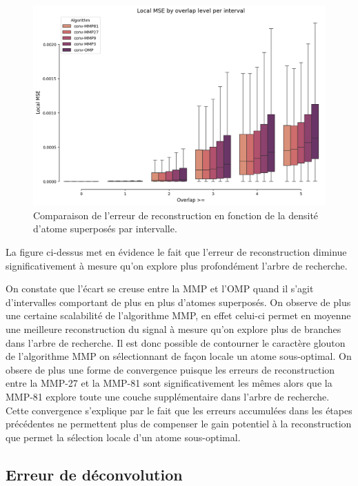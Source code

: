 \documentclass[9pt,a4paper,twoside]{rho}
\begin{document}
\begin{figure}[H]
    \centering
    \includegraphics[width=1\linewidth]{images/boxplot_mse.png}
    \caption{Comparaison de l'erreur de reconstruction en fonction de la densité d'atome superposés par intervalle.}
    \label{fig:boxplot_mse}
\end{figure}

La figure ci-dessus met en évidence le fait que l'erreur de reconstruction diminue significativement à mesure qu'on explore plus profondément l'arbre de recherche.

On constate que l'écart se creuse entre la MMP et l'OMP quand il s'agit d'intervalles comportant de plus en plus d'atomes superposés.
On observe de plus une certaine scalabilité de l'algorithme MMP, en effet celui-ci permet en moyenne une meilleure reconstruction du signal à mesure qu'on explore plus de branches dans l'arbre de recherche.
Il est donc possible de contourner le caractère glouton de l'algorithme MMP on sélectionnant de façon locale un atome sous-optimal.
On obsere de plus une forme de convergence puisque les erreurs de reconstruction entre la MMP-27 et la MMP-81 sont significativement les mêmes alors que la MMP-81 explore toute une couche supplémentaire dans l'arbre de recherche.
Cette convergence s'explique par le fait que les erreurs accumulées dans les étapes précédentes ne permettent plus de compenser le gain potentiel à la reconstruction que permet la sélection locale d'un atome sous-optimal.


\subsection{Erreur de déconvolution} %
\end{document}
